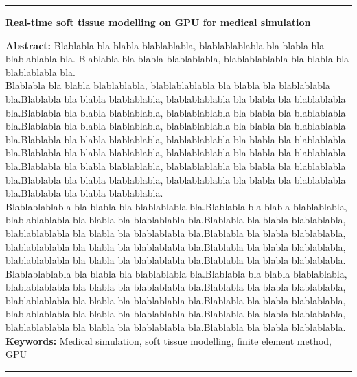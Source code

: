\cleardoublepage

\begin{vcenterpage}
\noindent\rule[2pt]{\textwidth}{0.5pt}
\begin{center}
{\large\textbf{Real-time soft tissue modelling on GPU for medical simulation\\}}
\end{center}
{\large\textbf{Abstract:}}
Blablabla bla blabla blablablabla, blablablablabla bla blabla bla blablablabla bla. Blablabla bla blabla blablablabla, blablablablabla bla blabla bla blablablabla bla.
\\
Blablabla bla blabla blablablabla, blablablablabla bla blabla bla blablablabla bla.Blablabla bla blabla blablablabla, blablablablabla bla blabla bla blablablabla bla.Blablabla bla blabla blablablabla, blablablablabla bla blabla bla blablablabla bla.Blablabla bla blabla blablablabla, blablablablabla bla blabla bla blablablabla bla.Blablabla bla blabla blablablabla, blablablablabla bla blabla bla blablablabla bla.Blablabla bla blabla blablablabla, blablablablabla bla blabla bla blablablabla bla.Blablabla bla blabla blablablabla, blablablablabla bla blabla bla blablablabla bla.Blablabla bla blabla blablablabla, blablablablabla bla blabla bla blablablabla bla.Blablabla bla blabla blablablabla. \\

Blablablablabla bla blabla bla blablablabla bla.Blablabla bla blabla blablablabla, blablablablabla bla blabla bla blablablabla bla.Blablabla bla blabla blablablabla, blablablablabla bla blabla bla blablablabla bla.Blablabla bla blabla blablablabla, blablablablabla bla blabla bla blablablabla bla.Blablabla bla blabla blablablabla, blablablablabla bla blabla bla blablablabla bla.Blablabla bla blabla blablablabla. \\

Blablablablabla bla blabla bla blablablabla bla.Blablabla bla blabla blablablabla, blablablablabla bla blabla bla blablablabla bla.Blablabla bla blabla blablablabla, blablablablabla bla blabla bla blablablabla bla.Blablabla bla blabla blablablabla, blablablablabla bla blabla bla blablablabla bla.Blablabla bla blabla blablablabla, blablablablabla bla blabla bla blablablabla bla.Blablabla bla blabla blablablabla.
\\
{\large\textbf{Keywords:}}
Medical simulation, soft tissue modelling, finite element method, GPU
\\
\noindent\rule[2pt]{\textwidth}{0.5pt}
\end{vcenterpage}